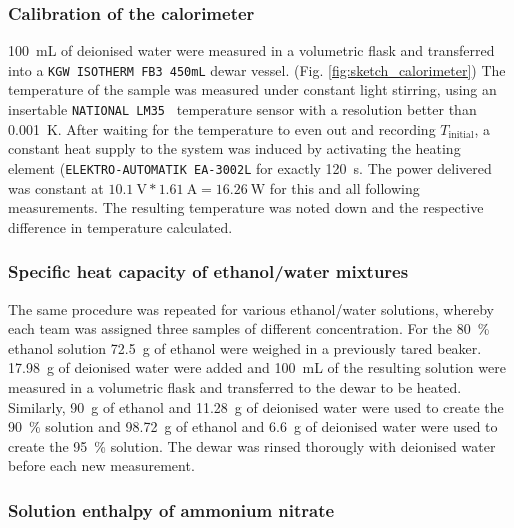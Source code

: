 \subsubsection{Calibration of the calorimeter}

\qty{100}{\milli\liter} of deionised water were measured in a volumetric flask and transferred into a \texttt{KGW ISOTHERM FB3 450mL} dewar vessel. (Fig. \ref{fig:sketch_calorimeter}) The temperature of the sample was measured under constant light stirring,  using an insertable \texttt{NATIONAL LM35 } temperature sensor with a resolution better than \qty{0.001}{\kelvin}. After waiting for the temperature to even out and recording  $T_{\mathrm{initial}}$, a constant heat supply to the system was induced by activating the heating element (\texttt{ELEKTRO-AUTOMATIK EA-3002L} for exactly \qty{120}{\second}. The power delivered was constant at $\qty{10.1}{\volt} * \qty{1.61}{\ampere} = \qty{16.26}{\watt}$ for this and all following measurements. The resulting temperature was noted down and the respective difference in temperature calculated. 


\subsubsection{Specific heat capacity of ethanol/water mixtures}

The same procedure was repeated for various ethanol/water solutions, whereby each team was assigned three samples of different concentration. 
 For the \qty{80}{\percent} ethanol solution \qty{72.5}{\gram} of ethanol were weighed in a previously tared beaker.  \qty{17.98}{\gram} of deionised water were added and \qty{100}{\milli\liter} of the resulting solution were measured in a volumetric flask and transferred to the dewar to be heated. 
  Similarly, \qty{90}{\gram} of ethanol and \qty{11.28}{\gram} of deionised water were used to create the \qty{90}{\percent} solution and \qty{98.72}{\gram} of ethanol and \qty{6.6}{\gram} of deionised water were used to create the \qty{95}{\percent} solution. The dewar was rinsed thorougly with deionised water before each new measurement.


\subsubsection{Solution enthalpy of ammonium nitrate}

